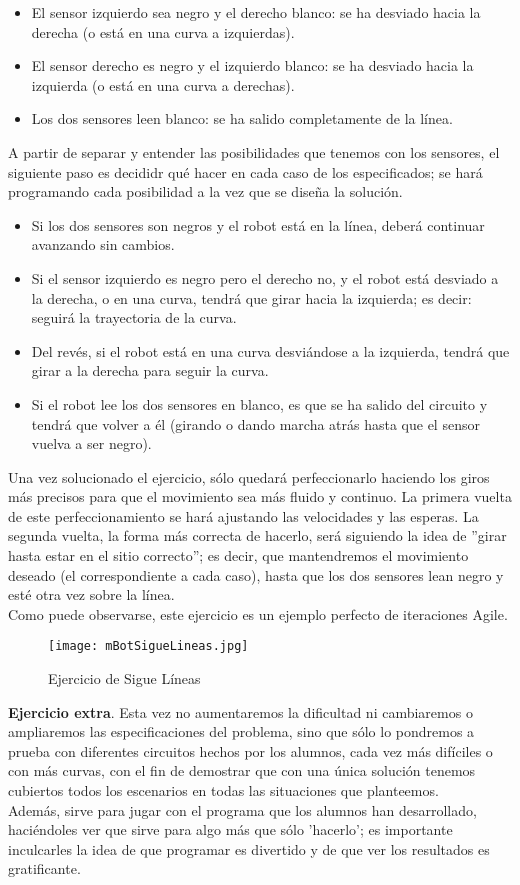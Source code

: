 \begin{description}
\begin{itemize}
	\item El sensor izquierdo sea negro y el derecho blanco: se ha desviado hacia la derecha (o está en una curva a izquierdas).
	\item El sensor derecho es negro y el izquierdo blanco: se ha desviado hacia la izquierda (o está en una curva a derechas).
	\item Los dos sensores leen blanco: se ha salido completamente de la línea.
\end{itemize}
A partir de separar y entender las posibilidades que tenemos con los sensores, el siguiente paso es decididr qué hacer en cada caso de los especificados; se hará programando cada posibilidad a la vez que se diseña la solución.
\begin{itemize}
	\item Si los dos sensores son negros y el robot está en la línea, deberá continuar avanzando sin cambios.
	\item Si el sensor izquierdo es negro pero el derecho no, y el robot está desviado a la derecha, o en una curva, tendrá que girar hacia la izquierda; es decir: seguirá la trayectoria de la curva.
	\item Del revés, si el robot está en una curva desviándose a la izquierda, tendrá que girar a la derecha para seguir la curva.
	\item Si el robot lee los dos sensores en blanco, es que se ha salido del circuito y tendrá que volver a él (girando o dando marcha atrás hasta que el sensor vuelva a ser negro).
\end{itemize}
Una vez solucionado el ejercicio, sólo quedará perfeccionarlo haciendo los giros más precisos para que el movimiento sea más fluido y continuo. La primera vuelta de este perfeccionamiento se hará ajustando las velocidades y las esperas. La segunda vuelta, la forma más correcta de hacerlo, será siguiendo la idea de ''girar hasta estar en el sitio correcto''; es decir, que mantendremos el movimiento deseado (el correspondiente a cada caso), hasta que los dos sensores lean negro y esté otra vez sobre la línea.\\
Como puede observarse, este ejercicio es un ejemplo perfecto de iteraciones Agile.

\begin{figure}[H]
	\texttt{[image: mBotSigueLineas.jpg]}
	\centering
	\label{img:mBotSigueLineas}
	\caption{Ejercicio de Sigue Líneas}
\end{figure}

\textbf{Ejercicio extra}. Esta vez no aumentaremos la dificultad ni cambiaremos o ampliaremos las especificaciones del problema, sino que sólo lo pondremos a prueba con diferentes circuitos hechos por los alumnos, cada vez más difíciles o con más curvas, con el fin de demostrar que con una única solución tenemos cubiertos todos los escenarios en todas las situaciones que planteemos. \\
Además, sirve para jugar con el programa que los alumnos han desarrollado, haciéndoles ver que sirve para algo más que sólo 'hacerlo'; es importante inculcarles la idea de que programar es divertido y de que ver los resultados es gratificante.


\end{description}
